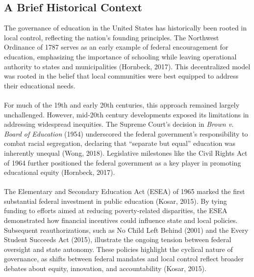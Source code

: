 \documentclass[11pt]{extarticle}
\begin{document}
\subsection{A Brief Historical Context}
The governance of education in the United States has historically been rooted in local control, reflecting the nation's founding principles. The Northwest Ordinance of 1787 serves as an early example of federal encouragement for education, emphasizing the importance of schooling while leaving operational authority to states and municipalities (Hornbeck, 2017). This decentralized model was rooted in the belief that local communities were best equipped to address their educational needs.\\
\\
For much of the 19th and early 20th centuries, this approach remained largely unchallenged. However, mid-20th century developments exposed its limitations in addressing widespread inequities. The Supreme Court’s decision in \textit{Brown v. Board of Education} (1954) underscored the federal government’s responsibility to combat racial segregation, declaring that “separate but equal” education was inherently unequal (Wong, 2018). Legislative milestones like the Civil Rights Act of 1964 further positioned the federal government as a key player in promoting educational equity (Hornbeck, 2017).\\
\\
The Elementary and Secondary Education Act (ESEA) of 1965 marked the first substantial federal investment in public education (Kosar, 2015). By tying funding to efforts aimed at reducing poverty-related disparities, the ESEA demonstrated how financial incentives could influence state and local policies. Subsequent reauthorizations, such as No Child Left Behind (2001) and the Every Student Succeeds Act (2015), illustrate the ongoing tension between federal oversight and state autonomy. These policies highlight the cyclical nature of governance, as shifts between federal mandates and local control reflect broader debates about equity, innovation, and accountability (Kosar, 2015).
\end{document}
